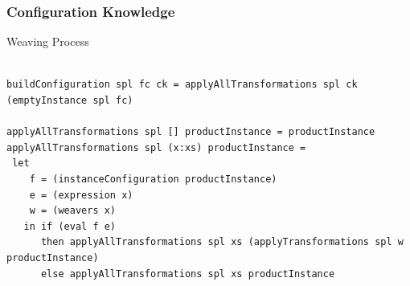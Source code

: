 \documentclass[xcolor=svgnames]{beamer}
\begin{document}
\begin{frame}[fragile,label=wp]
\frametitle{Configuration Knowledge}

\begin{block}{Weaving Process}
\begin{center}
\begin{tiny}
\begin{lstlisting}[frame=tb]

buildConfiguration spl fc ck = applyAllTransformations spl ck (emptyInstance spl fc)
    
applyAllTransformations spl [] productInstance = productInstance
applyAllTransformations spl (x:xs) productInstance = 
 let
 	f = (instanceConfiguration productInstance)
 	e = (expression x) 
 	w = (weavers x)
   in if (eval f e) 
      then applyAllTransformations spl xs (applyTransformations spl w productInstance) 
      else applyAllTransformations spl xs productInstance
\end{lstlisting}
\end{tiny}   
\end{center}  
\end{block}

\end{frame}
\end{document}

